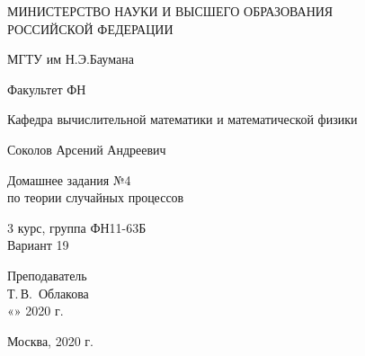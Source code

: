 \documentclass[14pt,a4paper]{scrartcl}
\begin{document}
	\begin{titlepage}
	\begin{center}
		\large
		МИНИСТЕРСТВО НАУКИ И ВЫСШЕГО ОБРАЗОВАНИЯ\\ РОССИЙСКОЙ ФЕДЕРАЦИИ
		
		\vspace{0.5cm}
		
		МГТУ им Н.Э.Баумана
		\vspace{0.25cm}
		
		Факультет ФН
		
		Кафедра вычислительной математики и математической физики
		\vfill
		
		
		Соколов Арсений Андреевич\\
		\vfill
		
		
		{\LARGE Домашнее задания №4 \\ по теории случайных процессов\\[2mm]
		}
		\bigskip
		
		3 курс, группа ФН11-63Б\\
		Вариант 19
	\end{center}
	\vfill
	
	\newlength{\ML}
	\hfill\begin{minipage}{0.4\textwidth}
		Преподаватель\\
		\underline{\hspace{3cm}} Т.\,В.~Облакова\\
		«\underline{\hspace{0.7cm}}» \underline{\hspace{1.71cm}} 2020 г.
	\end{minipage}%
	\bigskip
	
	
	\vfill
	
	\begin{center}
		Москва, 2020 г.
	\end{center}
\end{titlepage}

\tableofcontents
\end{document}
